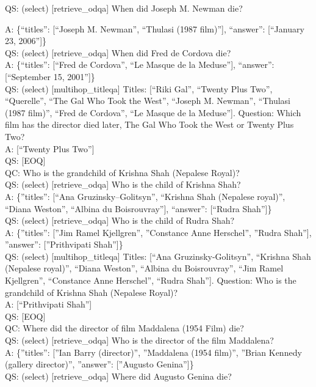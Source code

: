 \documentclass[
]{article}
\begin{document}
QS: (select) {[}retrieve\_odqa{]} When did Joseph M. Newman die?

A: \{``titles'': {[}``Joseph M. Newman'', ``Thulasi (1987 film)''{]},
``answer'': {[}``January 23, 2006''{]}\}\\
QS: (select) {[}retrieve\_odqa{]} When did Fred de Cordova die?\\
A: \{``titles'': {[}``Fred de Cordova'', ``Le Masque de la Meduse''{]},
``answer'': {[}``September 15, 2001''{]}\}\\
QS: (select) {[}multihop\_titleqa{]} Titles: {[}``Riki Gal'', ``Twenty
Plus Two'', ``Querelle'', ``The Gal Who Took the West'', ``Joseph M.
Newman'', ``Thulasi (1987 film)'', ``Fred de Cordova'', ``Le Masque de
la Meduse''{]}. Question: Which film has the director died later, The
Gal Who Took the West or Twenty Plus Two?\\
A: {[}``Twenty Plus Two''{]}\\
QS: {[}EOQ{]}\\
QC: Who is the grandchild of Krishna Shah (Nepalese Royal)?\\
QS: (select) {[}retrieve\_odqa{]} Who is the child of Krishna Shah?\\
A: \{''titles'': {[}``Ana Gruzinsky--Golitsyn'', ``Krishna Shah
(Nepalese royal)'', ``Diana Weston'', ``Albina du Boisrouvray''{]},
``answer'': {[}``Rudra Shah''{]}\}\\
QS: (select) {[}retrieve\_odqa{]} Who is the child of Rudra Shah?\\
A: \{''titles'': {[}''Jim Ramel Kjellgren'', ''Constance Anne
Herschel'', ''Rudra Shah''{]}, ''answer'': {[}''Prithvipati
Shah''{]}\}\\
QS: (select) {[}multihop\_titleqa{]} Titles: {[}``Ana
Gruzinsky-Golitsyn'', ``Krishna Shah (Nepalese royal)'', ``Diana
Weston'', ``Albina du Boisrouvray'', ``Jim Ramel Kjellgren'',
``Constance Anne Herschel'', ``Rudra Shah''{]}. Question: Who is the
grandchild of Krishna Shah (Nepalese Royal)?\\
A: {[}``Prithvipati Shah''{]}\\
QS: {[}EOQ{]}\\
QC: Where did the director of film Maddalena (1954 Film) die?\\
QS: (select) {[}retrieve\_odqa{]} Who is the director of the film
Maddalena?\\
A: \{''titles'': {[}''Ian Barry (director)'', ''Maddalena (1954 film)'',
''Brian Kennedy (gallery director)'', ''answer'': {[}''Augusto
Genina''{]}\}\\
QS: (select) {[}retrieve\_odqa{]} Where did Augusto Genina die?\\
\end{document}
